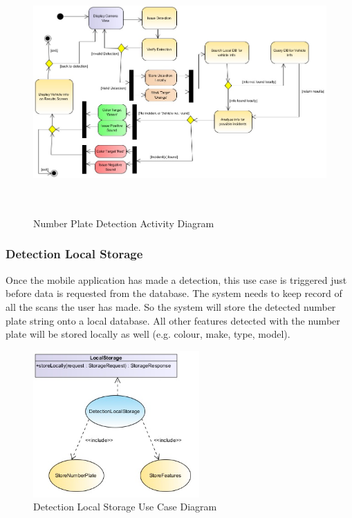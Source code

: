 \documentclass[12pt]{article}
\begin{document}
                    				\begin{figure}[h]
					           				\centering
					           				\includegraphics[width=6.25in, height=3.67in]{Pictures/NumberPlateDetectionActivity.jpg}
					           				\caption{Number Plate Detection Activity Diagram}
		           					\end{figure}
		                  				\FloatBarrier
                    				
                    		\subsubsection{Detection Local Storage}
                    				Once the mobile application has made a detection, this use case is triggered just before data is requested from the database. The system needs to keep record of all the scans the user has made. So the system will store the detected number plate string onto a local database. All other features detected with the number plate will be stored locally as well (e.g. colour, make, type, model).
                    				\begin{figure}[h]
					           				\centering
					           				\includegraphics[width=2.5in, height=2.21in]{Pictures/DetectionLocalStorageUseCase.jpg}
					           				\caption{Detection Local Storage Use Case Diagram}
		           					\end{figure}
                    				\FloatBarrier
\end{document}
